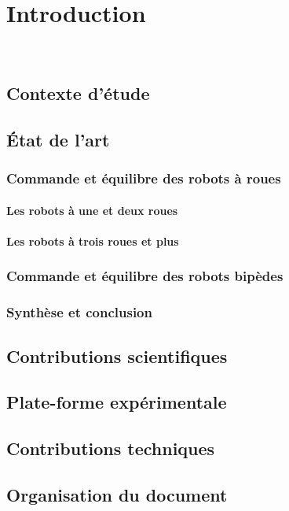\chapter{Introduction}

~

\section{Contexte d'étude}
	\section{État de l'art}
		\subsection{Commande et équilibre des robots à roues}
			\subsubsection{Les robots à une et deux roues}
			\subsubsection{Les robots à trois roues et plus}
		\subsection{Commande et équilibre des robots bipèdes}
		\subsection{Synthèse et conclusion}

	\section{Contributions scientifiques}
	\section{Plate-forme expérimentale}
	\section{Contributions techniques}
	\section{Organisation du document}